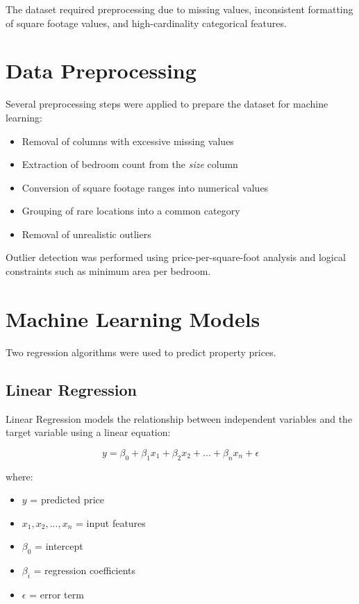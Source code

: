 \documentclass[12pt]{article}
\begin{document}
The dataset required preprocessing due to missing values, inconsistent formatting of square footage values, and high-cardinality categorical features.

\section{Data Preprocessing}

Several preprocessing steps were applied to prepare the dataset for machine learning:

\begin{itemize}
\item Removal of columns with excessive missing values
\item Extraction of bedroom count from the \textit{size} column
\item Conversion of square footage ranges into numerical values
\item Grouping of rare locations into a common category
\item Removal of unrealistic outliers
\end{itemize}

Outlier detection was performed using price-per-square-foot analysis and logical constraints such as minimum area per bedroom.

\section{Machine Learning Models}

Two regression algorithms were used to predict property prices.

\subsection{Linear Regression}

Linear Regression models the relationship between independent variables and the target variable using a linear equation:

\[
y = \beta_0 + \beta_1x_1 + \beta_2x_2 + ... + \beta_nx_n + \epsilon
\]

where:

\begin{itemize}
\item $y$ = predicted price
\item $x_1, x_2, ..., x_n$ = input features
\item $\beta_0$ = intercept
\item $\beta_i$ = regression coefficients
\item $\epsilon$ = error term
\end{itemize}
\end{document}
